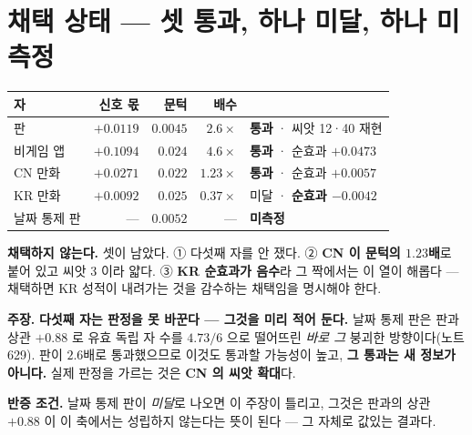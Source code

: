 \documentclass[10pt,a4paper]{article}
\newcommand{\claim}[2]{\begin{claimbox}\textbf{주장.} #1\par\smallskip
  \textcolor{gray!70}{\textbf{반증 조건.} #2}\end{claimbox}}
\begin{document}
\section{채택 상태 --- 셋 통과, 하나 미달, 하나 미측정}

\begin{center}
\begin{tabular}{lrrrl}
\toprule
자 & 신호 몫 & 문턱 & 배수 & \\
\midrule
판 & $+0.0119$ & $0.0045$ & $2.6\times$ & \textbf{통과} · 씨앗 12·40 재현 \\
비게임 앱 & $+0.1094$ & $0.024$ & $4.6\times$ & \textbf{통과} · 순효과 $+0.0473$ \\
CN 만화 & $+0.0271$ & $0.022$ & $1.23\times$ & \textbf{통과} · 순효과 $+0.0057$ \\
KR 만화 & $+0.0092$ & $0.025$ & $0.37\times$ & 미달 · \textbf{순효과 $-0.0042$} \\
날짜 통제 판 & --- & $0.0052$ & --- & \textbf{미측정} \\
\bottomrule
\end{tabular}
\end{center}

\textbf{채택하지 않는다.} 셋이 남았다. ① 다섯째 자를 안 쟀다. ② \textbf{CN 이 문턱의
$1.23$배}로 붙어 있고 씨앗 3 이라 얇다. ③ \textbf{KR 순효과가 음수}라 그 짝에서는 이
열이 해롭다 --- 채택하면 KR 성적이 내려가는 것을 감수하는 채택임을 명시해야 한다.

\claim{\textbf{다섯째 자는 판정을 못 바꾼다 --- 그것을 미리 적어 둔다.} 날짜 통제 판은
판과 상관 $+0.88$ 로 유효 독립 자 수를 $4.73/6$ 으로 떨어뜨린 \emph{바로 그} 붕괴한
방향이다(노트 629). 판이 $2.6$배로 통과했으므로 이것도 통과할 가능성이 높고,
\textbf{그 통과는 새 정보가 아니다.} 실제 판정을 가르는 것은 \textbf{CN 의 씨앗 확대}다.}
{날짜 통제 판이 \emph{미달}로 나오면 이 주장이 틀리고, 그것은 판과의 상관 $+0.88$ 이
이 축에서는 성립하지 않는다는 뜻이 된다 --- 그 자체로 값있는 결과다.}
\end{document}
